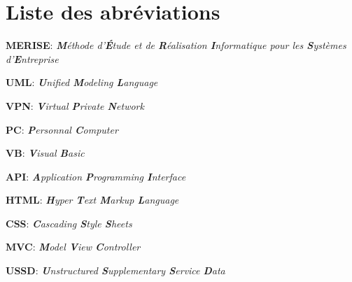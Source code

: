 \chapter*{Liste des abréviations}


\begin{flushleft}
	\textbf{MERISE}:  \textit{ \textbf{M}éthode d'\textbf{É}tude et de  \textbf{R}éalisation \textbf{I}nformatique pour les \textbf{S}ystèmes d'\textbf{E}ntreprise\\}
\end{flushleft}

\begin{flushleft}
	\textbf{UML}:  \textit{\textbf{U}nified \textbf{M}odeling \textbf{L}anguage}
\end{flushleft}

\begin{flushleft}
	\textbf{VPN}:  \textit{\textbf{V}irtual \textbf{P}rivate \textbf{N}etwork}
\end{flushleft}

\begin{flushleft}
	\textbf{PC}:  \textit{\textbf{P}ersonnal \textbf{C}omputer}
\end{flushleft}

\begin{flushleft}
	\textbf{VB}:  \textit{\textbf{V}isual \textbf{B}asic}
\end{flushleft}

\begin{flushleft}
	\textbf{API}:  \textit{\textbf{A}pplication \textbf{P}rogramming \textbf{I}nterface}
\end{flushleft}

\begin{flushleft}
	\textbf{HTML}:  \textit{\textbf{H}yper \textbf{T}ext \textbf{M}arkup \textbf{L}anguage}
\end{flushleft}

\begin{flushleft}
	\textbf{CSS}:  \textit{\textbf{C}ascading \textbf{S}tyle \textbf{S}heets}
\end{flushleft}

\begin{flushleft}
	\textbf{MVC}:  \textit{\textbf{M}odel \textbf{V}iew \textbf{C}ontroller}
\end{flushleft}

\begin{flushleft}
	\textbf{USSD}:  \textit{\textbf{U}nstructured \textbf{S}upplementary \textbf{S}ervice \textbf{D}ata}
\end{flushleft}